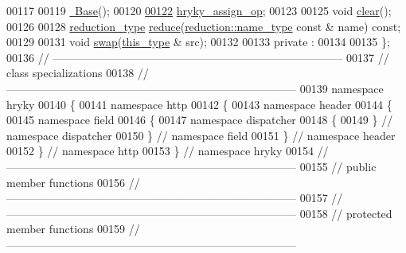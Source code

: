 \begin{DoxyCode}
00117 
00119     \hyperlink{classhryky_1_1http_1_1header_1_1field_1_1dispatcher_1_1_base_a722da881b6c70cfcbde9243abcfbf334}{~Base}();
00120 
\hypertarget{http__header__field__dispatcher__base_8h_source_l00122}{}\hyperlink{classhryky_1_1http_1_1header_1_1field_1_1dispatcher_1_1_base_a40c34ada6910c5e49c0b263fe59593e6}{00122}     \hyperlink{classhryky_1_1http_1_1header_1_1field_1_1dispatcher_1_1_base_a40c34ada6910c5e49c0b263fe59593e6}{hryky_assign_op};
00123 
00125     \textcolor{keywordtype}{void} \hyperlink{classhryky_1_1http_1_1header_1_1field_1_1dispatcher_1_1_base_a135bce05655e290c78fa83196199a576}{clear}();
00126 
00128     \hyperlink{classhryky_1_1_intrusive_ptr}{reduction_type} \hyperlink{classhryky_1_1http_1_1header_1_1field_1_1dispatcher_1_1_base_a2809ad5f75abd2266e6804e90094bc05}{reduce}(\hyperlink{classhryky_1_1reduction_1_1_string}{reduction::name_type} \textcolor{keyword}{const} & name) \textcolor{keyword}{const};
00129 
00131     \textcolor{keywordtype}{void} \hyperlink{classhryky_1_1http_1_1header_1_1field_1_1dispatcher_1_1_base_ab2b137d16fbe40d839ee136bd5304cab}{swap}(\hyperlink{classhryky_1_1http_1_1header_1_1field_1_1dispatcher_1_1_base}{this_type} & src);
00132 
00133 \textcolor{keyword}{private} :
00134 
00135 \};
00136 \textcolor{comment}{//
      ------------------------------------------------------------------------------}
00137 \textcolor{comment}{// class specializations}
00138 \textcolor{comment}{//
      ------------------------------------------------------------------------------}
00139 \textcolor{keyword}{namespace }hryky
00140 \{
00141 \textcolor{keyword}{namespace }http
00142 \{
00143 \textcolor{keyword}{namespace }header
00144 \{
00145 \textcolor{keyword}{namespace }field
00146 \{
00147 \textcolor{keyword}{namespace }dispatcher
00148 \{
00149 \} \textcolor{comment}{// namespace dispatcher}
00150 \} \textcolor{comment}{// namespace field}
00151 \} \textcolor{comment}{// namespace header}
00152 \} \textcolor{comment}{// namespace http}
00153 \} \textcolor{comment}{// namespace hryky}
00154 \textcolor{comment}{//
      ------------------------------------------------------------------------------}
00155 \textcolor{comment}{// public member functions}
00156 \textcolor{comment}{//
      ------------------------------------------------------------------------------}
00157 \textcolor{comment}{//
      ------------------------------------------------------------------------------}
00158 \textcolor{comment}{// protected member functions}
00159 \textcolor{comment}{//
      ------------------------------------------------------------------------------}

\end{DoxyCode}
